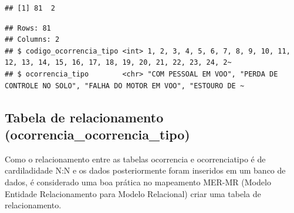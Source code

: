 \documentclass[
]{article}
\newenvironment{Shaded}{\begin{snugshade}}{\end{snugshade}}
\newcommand{\AttributeTok}[1]{\textcolor[rgb]{0.77,0.63,0.00}{#1}}
\newcommand{\ConstantTok}[1]{\textcolor[rgb]{0.00,0.00,0.00}{#1}}
\newcommand{\FunctionTok}[1]{\textcolor[rgb]{0.00,0.00,0.00}{#1}}
\newcommand{\NormalTok}[1]{#1}
\newcommand{\SpecialCharTok}[1]{\textcolor[rgb]{0.00,0.00,0.00}{#1}}
\newcommand{\StringTok}[1]{\textcolor[rgb]{0.31,0.60,0.02}{#1}}
\begin{document}
\begin{verbatim}
## [1] 81  2
\end{verbatim}

\begin{Shaded}
\end{Shaded}

\begin{verbatim}
## Rows: 81
## Columns: 2
## $ codigo_ocorrencia_tipo <int> 1, 2, 3, 4, 5, 6, 7, 8, 9, 10, 11, 12, 13, 14, 15, 16, 17, 18, 19, 20, 21, 22, 23, 24, 2~
## $ ocorrencia_tipo        <chr> "COM PESSOAL EM VOO", "PERDA DE CONTROLE NO SOLO", "FALHA DO MOTOR EM VOO", "ESTOURO DE ~
\end{verbatim}

\begin{Shaded}
\end{Shaded}

\hypertarget{tabela-de-relacionamento-ocorrencia_ocorrencia_tipo}{%
\subsection{Tabela de relacionamento
(ocorrencia\_ocorrencia\_tipo)}\label{tabela-de-relacionamento-ocorrencia_ocorrencia_tipo}}

Como o relacionamento entre as tabelas ocorrencia e ocorrenciatipo é de
cardiladidade N:N e os dados posteriormente foram inseridos em um banco
de dados, é considerado uma boa prática no mapeamento MER-MR (Modelo
Entidade Relacionamento para Modelo Relacional) criar uma tabela de
relacionamento.
\end{document}
